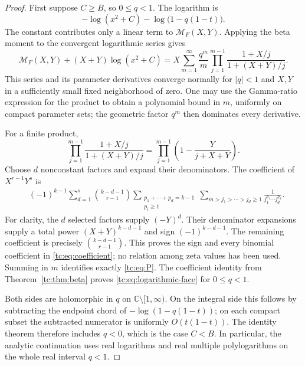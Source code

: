 \begin{proof}
First suppose $C\ge B$, so $0\le q<1$.  The logarithm is
\[
 -\log(x^2+C)-\log\bigl(1-q(1-t)\bigr).
\]
The constant contributes only a linear term to
$\mathcal M_F(X,Y)$.  Applying the beta moment to the convergent
logarithmic series gives
\begin{equation}\label{tc:eq:log-generating-function}
 \mathcal M_F(X,Y)+(X+Y)\log(x^2+C)
   =X\sum_{m=1}^{\infty}\frac{q^m}{m}
            \prod_{j=1}^{m-1}\frac{1+X/j}{1+(X+Y)/j}.
\end{equation}
This series and its parameter derivatives converge normally for
$|q|<1$ and $X,Y$ in a sufficiently small fixed neighborhood of
zero.  One may use the Gamma-ratio expression for the product to
obtain a polynomial bound in $m$, uniformly on compact parameter
sets; the geometric factor $q^m$ then dominates every derivative.

For a finite product,
\[
 \prod_{j=1}^{m-1}\frac{1+X/j}{1+(X+Y)/j}
   =\prod_{j=1}^{m-1}\left(1-\frac{Y}{j+X+Y}\right).
\]
Choose $d$ nonconstant factors and expand their denominators.
The coefficient of $X^{r-1}Y^s$ is
\begin{align}
 &(-1)^{k-1}\sum_{d=1}^{s}\binom{k-d-1}{r-1}
  \sum_{\substack{p_1+\cdots+p_d=k-1\\p_i\ge1}}
  \sum_{m>j_1>\cdots>j_d\ge1}
                \frac{1}{j_1^{p_1}\cdots j_d^{p_d}}.
                                                     \label{tc:eq:coefficient}
\end{align}
For clarity, the $d$ selected factors supply $(-Y)^d$.
Their denominator expansions supply a total power
$(X+Y)^{k-d-1}$ and sign $(-1)^{k-d-1}$.
The remaining coefficient is precisely
$\binom{k-d-1}{r-1}$.  This proves the sign and every binomial
coefficient in \eqref{tc:eq:coefficient}; no relation among zeta
values has been used.  Summing in $m$ identifies exactly
\eqref{tc:eq:P}.  The coefficient identity from
Theorem~\ref{tc:thm:beta} proves
\eqref{tc:eq:logarithmic-face} for $0\le q<1$.

Both sides are holomorphic in $q$ on
$\mathbb C\setminus[1,\infty)$.  On the integral side this follows
by subtracting the endpoint chord of $-\log(1-q(1-t))$;
on each compact subset the subtracted numerator is uniformly
$O(t(1-t))$.  The identity theorem therefore includes $q<0$,
which is the case $C<B$.  In particular, the analytic continuation
uses real logarithms and real multiple polylogarithms on the whole
real interval $q<1$.
\end{proof}

